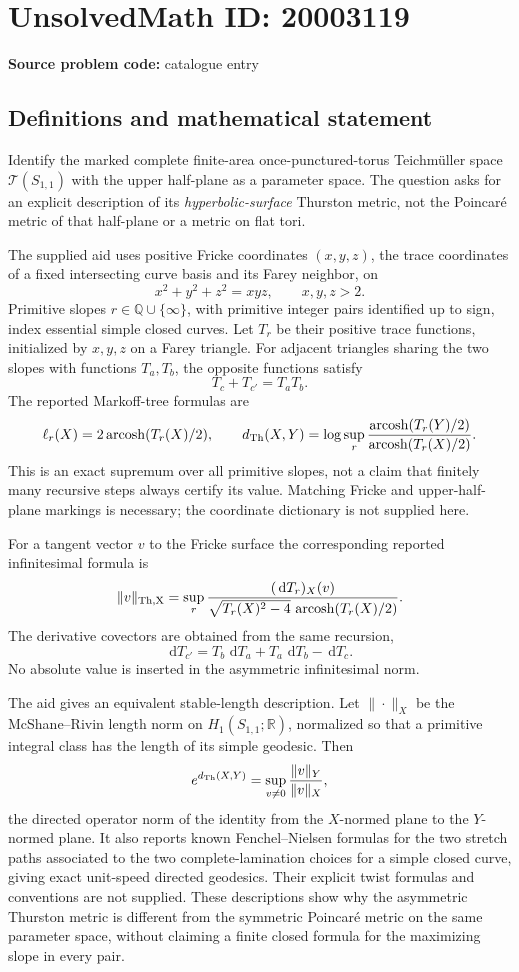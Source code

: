 \documentclass[11pt]{article}
\newcommand{\Q}{\mathbb{Q}}
\newcommand{\R}{\mathbb{R}}
\newcommand{\dd}{\,\mathrm{d}}
\begin{document}
\section*{UnsolvedMath ID: 20003119}
\textbf{Source problem code:} catalogue entry
\subsection{Definitions and mathematical statement}
Identify the marked complete finite-area once-punctured-torus Teichm\"uller space \(\mathcal T(S_{1,1})\) with the upper half-plane as a parameter space. The question asks for an explicit description of its \emph{hyperbolic-surface} Thurston metric, not the Poincar\'e metric of that half-plane or a metric on flat tori.

The supplied aid uses positive Fricke coordinates \((x,y,z)\), the trace coordinates of a fixed intersecting curve basis and its Farey neighbor, on
\[
x^2+y^2+z^2=xyz,\qquad x,y,z>2.
\]
Primitive slopes \(r\in\Q\cup\{\infty\}\), with primitive integer pairs identified up to sign, index essential simple closed curves. Let \(T_r\) be their positive trace functions, initialized by \(x,y,z\) on a Farey triangle. For adjacent triangles sharing the two slopes with functions \(T_a,T_b\), the opposite functions satisfy
\[
T_c+T_{c'}=T_aT_b.
\]
The reported Markoff-tree formulas are
\[
\ell_r(X)=2\operatorname{arcosh}(T_r(X)/2),\qquad
 d_{\rm Th}(X,Y)=\log\sup_r
\frac{\operatorname{arcosh}(T_r(Y)/2)}{\operatorname{arcosh}(T_r(X)/2)}.
\]
This is an exact supremum over all primitive slopes, not a claim that finitely many recursive steps always certify its value. Matching Fricke and upper-half-plane markings is necessary; the coordinate dictionary is not supplied here.

For a tangent vector \(v\) to the Fricke surface the corresponding reported infinitesimal formula is
\[
\|v\|_{\rm Th,X}=\sup_r
\frac{(\dd T_r)_X(v)}{\sqrt{T_r(X)^2-4}\,\operatorname{arcosh}(T_r(X)/2)}.
\]
The derivative covectors are obtained from the same recursion,
\[
\dd T_{c'}=T_b\,\dd T_a+T_a\,\dd T_b-\dd T_c.
\]
No absolute value is inserted in the asymmetric infinitesimal norm.

The aid gives an equivalent stable-length description. Let \(\|\cdot\|_X\) be the McShane--Rivin length norm on \(H_1(S_{1,1};\R)\), normalized so that a primitive integral class has the length of its simple geodesic. Then
\[
e^{d_{\rm Th}(X,Y)}=\sup_{v\ne0}\frac{\|v\|_Y}{\|v\|_X},
\]
the directed operator norm of the identity from the \(X\)-normed plane to the \(Y\)-normed plane. It also reports known Fenchel--Nielsen formulas for the two stretch paths associated to the two complete-lamination choices for a simple closed curve, giving exact unit-speed directed geodesics. Their explicit twist formulas and conventions are not supplied. These descriptions show why the asymmetric Thurston metric is different from the symmetric Poincar\'e metric on the same parameter space, without claiming a finite closed formula for the maximizing slope in every pair.
\end{document}
